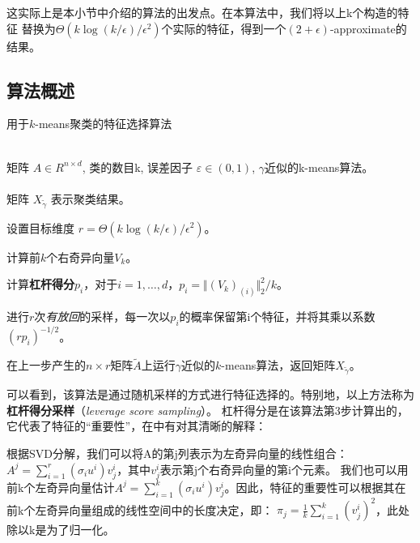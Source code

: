 \documentclass{ctexart}
\begin{document}
    这实际上是本小节中介绍的算法的出发点。在本算法中，我们将以上k个构造的特征
    替换为$\Theta(k \log(k / \epsilon) / \epsilon^2)$个实际的特征，得到一个$(2+\epsilon)$-approximate的结果。

    \subsection{算法概述}
    \begin{algorithm}[htb]
    \caption{用于$k$-means聚类的特征选择算法}
    \label{SVD}
        \begin{algorithmic}[1] %
        \REQUIRE ~~\\ %
            矩阵 $ A \in R^{n \times d}$, 类的数目k, 误差因子 $\varepsilon \in (0, 1)$, $\gamma$近似的k-means算法。 \\
        \ENSURE ~~\\ %
            矩阵 $ X_{\tilde{\gamma}} $ 表示聚类结果。

        \STATE 设置目标维度 $ r = \Theta(k \log(k / \epsilon) / \epsilon^2)$。

        \STATE 计算前$k$个右奇异向量$V_k$。

        \STATE 计算\textbf{杠杆得分}$p_i$，对于$i=1, \dots, d$，$p_i = \Vert (V_k)_{(i)} \Vert_2^2 / k$。
        \label{compls}

        \STATE 进行$r$次\textit{有放回}的采样，每一次以$p_i$的概率保留第i个特征，并将其乘以系数$(rp_i)^{-1/2}$。

        \STATE 在上一步产生的$n \times r$矩阵$\tilde{A}$上运行$\gamma$近似的$k$-means算法，返回矩阵$X_{\tilde{\gamma}}$。

        \end{algorithmic}
    \end{algorithm}

    可以看到，该算法是通过随机采样的方式进行特征选择的。特别地，以上方法称为\textbf{杠杆得分采样}（\textit{leverage score sampling}）。
    杠杆得分是在该算法第3步计算出的，它代表了特征的“重要性”，在\cite{Mahoney2009cur}中有对其清晰的解释：

    根据SVD分解，我们可以将A的第j列表示为左奇异向量的线性组合：$A^j=\sum_{i=1}^{r} (\sigma_i u^i)v_j^i$，其中$v_j^i$表示第j个右奇异向量的第i个元素。
    我们也可以用前k个左奇异向量估计$A^j=\sum_{i=1}^{k} (\sigma_i u^i)v_j^i$。因此，特征的重要性可以根据其在前k个左奇异向量组成的线性空间中的长度决定，即：
    $\pi_j = \frac{1}{k} \sum_{i=1}^{k} (v_j^i)^2$，此处除以k是为了归一化。
\end{document}
